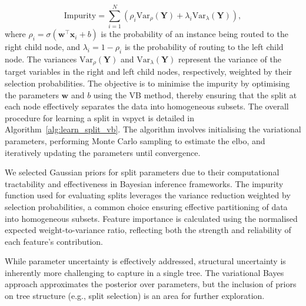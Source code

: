 \documentclass[3p,review,authoryear]{elsarticle}
\begin{document}
\begin{equation}
\text{Impurity} = \sum_{i=1}^{N} \left(\rho_i \text{Var}_{\rho}(\mathbf{Y}) + \lambda_i  \text{Var}_{\lambda}(\mathbf{Y})\right),
\end{equation}
where \(\rho_i = \sigma(\mathbf{w}^\top \mathbf{x}_i + b)\) is the probability of an instance being routed to the right child node, and \(\lambda_i = 1 - \rho_i\) is the probability of routing to the left child node.
The variances \(\text{Var}_{\rho}(\mathbf{Y})\) and \(\text{Var}_{\lambda}(\mathbf{Y})\) represent the variance of the target variables in the right and left child nodes, respectively, weighted by their selection probabilities.
The objective is to minimise the impurity by optimising the parameters \(\mathbf{w}\) and \(b\) using the VB method, thereby ensuring that the split at each node effectively separates the data into homogeneous subsets.
The overall procedure for learning a split in \gls{vspyct} is detailed in Algorithm~\ref{alg:learn_split_vb}.
The algorithm involves initialising the variational parameters, performing Monte Carlo sampling to estimate the \gls{elbo}, and iteratively updating the parameters until convergence.

We selected Gaussian priors for split parameters due to their computational tractability and effectiveness in Bayesian inference frameworks.
The impurity function used for evaluating splits leverages the variance reduction weighted by selection probabilities, a common choice ensuring effective partitioning of data into homogeneous subsets.
Feature importance is calculated using the normalised expected weight-to-variance ratio, reflecting both the strength and reliability of each feature's contribution.

While parameter uncertainty is effectively addressed, structural uncertainty is inherently more challenging to capture in a single tree. The variational Bayes approach approximates the posterior over parameters, but the inclusion of priors on tree structure (e.g., split selection) is an area for further exploration.
\end{document}
